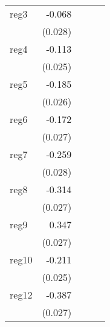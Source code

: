 {\begin{longtable}{l*{4}{D{.}{.}{-1}}}
\addlinespace
reg3        &      -0.068\sym{*}  &                     &                     &                     \\
            &     (0.028)         &                     &                     &                     \\
\addlinespace
reg4        &      -0.113\sym{***}&                     &                     &                     \\
            &     (0.025)         &                     &                     &                     \\
\addlinespace
reg5        &      -0.185\sym{***}&                     &                     &                     \\
            &     (0.026)         &                     &                     &                     \\
\addlinespace
reg6        &      -0.172\sym{***}&                     &                     &                     \\
            &     (0.027)         &                     &                     &                     \\
\addlinespace
reg7        &      -0.259\sym{***}&                     &                     &                     \\
            &     (0.028)         &                     &                     &                     \\
\addlinespace
reg8        &      -0.314\sym{***}&                     &                     &                     \\
            &     (0.027)         &                     &                     &                     \\
\addlinespace
reg9        &       0.347\sym{***}&                     &                     &                     \\
            &     (0.027)         &                     &                     &                     \\
\addlinespace
reg10       &      -0.211\sym{***}&                     &                     &                     \\
            &     (0.025)         &                     &                     &                     \\
\addlinespace
reg12       &      -0.387\sym{***}&                     &                     &                     \\
            &     (0.027)         &                     &                     &                     \\

\end{longtable}}
